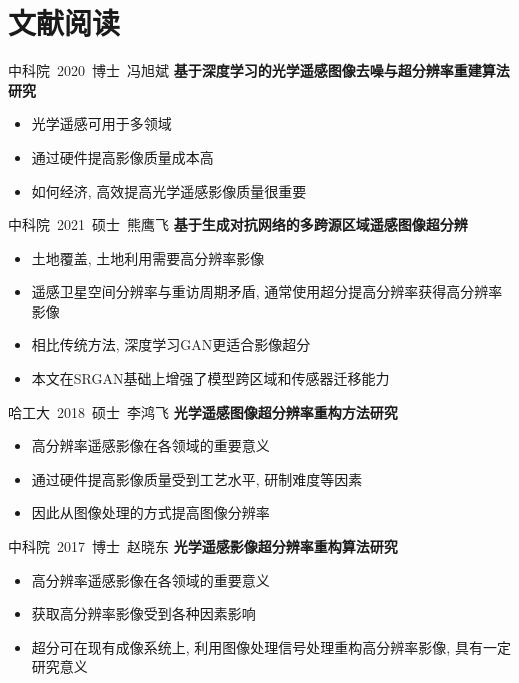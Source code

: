 \section{文献阅读}

\begin{frame}{中科院\ 2020\ 博士\ 冯旭斌}
    \textbf{基于深度学习的光学遥感图像去噪与超分辨率重建算法研究}\\[1cm]

    \begin{itemize}
        \item 光学遥感可用于多领域
        \item 通过硬件提高影像质量成本高
        \item 如何经济, 高效提高光学遥感影像质量很重要
    \end{itemize}
\end{frame}

\begin{frame}{中科院\ 2021\ 硕士\ 熊鹰飞}
    \textbf{基于生成对抗网络的多跨源区域遥感图像超分辨}\\[1cm]

    \begin{itemize}
        \item 土地覆盖, 土地利用需要高分辨率影像
        \item 遥感卫星空间分辨率与重访周期矛盾, 通常使用超分提高分辨率获得高分辨率影像
        \item 相比传统方法, 深度学习GAN更适合影像超分
        \item 本文在SRGAN基础上增强了模型跨区域和传感器迁移能力
    \end{itemize}
    
\end{frame}

\begin{frame}{哈工大\ 2018\ 硕士\ 李鸿飞}
    \textbf{光学遥感图像超分辨率重构方法研究}\\[1cm]
    
    \begin{itemize}
        \item 高分辨率遥感影像在各领域的重要意义
        \item 通过硬件提高影像质量受到工艺水平, 研制难度等因素
        \item 因此从图像处理的方式提高图像分辨率
    \end{itemize}
\end{frame}

\begin{frame}{中科院\ 2017\ 博士\ 赵晓东}
    \textbf{光学遥感影像超分辨率重构算法研究}\\[1cm]
    
    \begin{itemize}
        \item 高分辨率遥感影像在各领域的重要意义
        \item 获取高分辨率影像受到各种因素影响
        \item 超分可在现有成像系统上, 利用图像处理信号处理重构高分辨率影像, 具有一定研究意义
    \end{itemize}
\end{frame}

